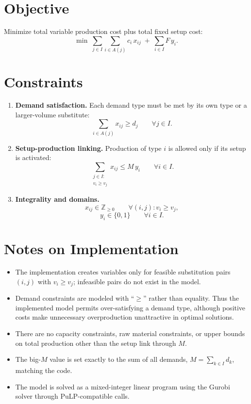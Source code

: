\section*{Objective}

Minimize total variable production cost plus total fixed setup cost:
\[
\min \;
\sum_{j \in I}\sum_{i \in A(j)} c_i\, x_{ij}
\;+\;
\sum_{i \in I} F\, y_i.
\]

\section*{Constraints}

\begin{enumerate}
    \item \textbf{Demand satisfaction.} Each demand type must be met by its own type or a larger-volume substitute:
    \[
    \sum_{i \in A(j)} x_{ij} \ge d_j
    \qquad \forall j \in I.
    \]

    \item \textbf{Setup-production linking.} Production of type $i$ is allowed only if its setup is activated:
    \[
    \sum_{\substack{j \in I:\\ v_i \ge v_j}} x_{ij} \le M\, y_i
    \qquad \forall i \in I.
    \]

    \item \textbf{Integrality and domains.}
    \[
    x_{ij} \in \mathbb{Z}_{\ge 0}
    \qquad \forall (i,j): v_i \ge v_j,
    \]
    \[
    y_i \in \{0,1\}
    \qquad \forall i \in I.
    \]
\end{enumerate}

\section*{Notes on Implementation}

\begin{itemize}
    \item The implementation creates variables only for feasible substitution pairs $(i,j)$ with $v_i \ge v_j$; infeasible pairs do not exist in the model.
    \item Demand constraints are modeled with ``$\ge$'' rather than equality. Thus the implemented model permits over-satisfying a demand type, although positive costs make unnecessary overproduction unattractive in optimal solutions.
    \item There are no capacity constraints, raw material constraints, or upper bounds on total production other than the setup link through $M$.
    \item The big-$M$ value is set exactly to the sum of all demands, $M=\sum_{k\in I} d_k$, matching the code.
    \item The model is solved as a mixed-integer linear program using the Gurobi solver through PuLP-compatible calls.
\end{itemize}
